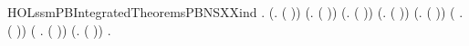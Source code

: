 \begin{SaveVerbatim}{HOLssmPBIntegratedTheoremsPBNSXXind}
\HOLTokenTurnstile{} \HOLSymConst{\HOLTokenForall{}}.
     (\HOLSymConst{\HOLTokenForall{}}.   ( )) \HOLSymConst{\HOLTokenConj{}} (\HOLSymConst{\HOLTokenForall{}}.   ( )) \HOLSymConst{\HOLTokenConj{}}
     (\HOLSymConst{\HOLTokenForall{}}.   ( )) \HOLSymConst{\HOLTokenConj{}}
     (\HOLSymConst{\HOLTokenForall{}}.   ( )) \HOLSymConst{\HOLTokenConj{}} (\HOLSymConst{\HOLTokenForall{}}.   ( )) \HOLSymConst{\HOLTokenConj{}}
     (\HOLSymConst{\HOLTokenForall{}} .   ( )) \HOLSymConst{\HOLTokenConj{}} (\HOLSymConst{\HOLTokenForall{}} .   ( )) \HOLSymConst{\HOLTokenConj{}}
     (\HOLSymConst{\HOLTokenForall{}}.   ( )) \HOLSymConst{\HOLTokenImp{}}
     \HOLSymConst{\HOLTokenForall{}} .   
\end{SaveVerbatim}
\newcommand{\HOLssmPBIntegratedTheoremsPBNSXXind}{\UseVerbatim{HOLssmPBIntegratedTheoremsPBNSXXind}}

